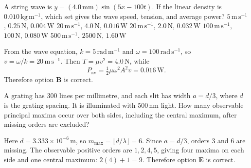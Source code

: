 \begin{quizquestion}[
  id=phy104-wave-031,
  topic=waves-and-sound,
  difficulty=applied,
  marks=2,
  correct=B,
  tags={travelling-wave,string,power},
  outcome={Relate a wave equation to speed tension and average power}
]
  A string wave is
  \(y=(4.0\,\mathrm{mm})\sin(5x-100t)\). If the linear density is
  \(0.010\,\mathrm{kg\,m^{-1}}\), which set gives the wave speed, tension,
  and average power?
  \choices
    {\(5\,\mathrm{m\,s^{-1}}\), \(0.25\,\mathrm{N}\), \(0.004\,\mathrm{W}\)}
    {\(20\,\mathrm{m\,s^{-1}}\), \(4.0\,\mathrm{N}\), \(0.016\,\mathrm{W}\)}
    {\(20\,\mathrm{m\,s^{-1}}\), \(2.0\,\mathrm{N}\), \(0.032\,\mathrm{W}\)}
    {\(100\,\mathrm{m\,s^{-1}}\), \(100\,\mathrm{N}\), \(0.080\,\mathrm{W}\)}
    {\(500\,\mathrm{m\,s^{-1}}\), \(2500\,\mathrm{N}\), \(1.60\,\mathrm{W}\)}
\end{quizquestion}
\begin{quizsolution}
  From the wave equation, \(k=5\,\mathrm{rad\,m^{-1}}\) and
  \(\omega=100\,\mathrm{rad\,s^{-1}}\), so
  \(v=\omega/k=20\,\mathrm{m\,s^{-1}}\). Then
  \(T=\mu v^2=4.0\,\mathrm{N}\), while
  \[
    P_{\mathrm{av}}=\tfrac12\mu\omega^2A^2v=0.016\,\mathrm{W}.
  \]
  Therefore option \textbf{B} is correct.
\end{quizsolution}

\begin{quizquestion}[
  id=phy104-opt-060,
  topic=optics,
  difficulty=challenge,
  marks=3,
  correct=E,
  tags={diffraction-grating,missing-orders},
  outcome={Combine grating-order limits with missing-order conditions}
]
  A grating has \(300\) lines per millimetre, and each slit has width
  \(a=d/3\), where \(d\) is the grating spacing. It is illuminated with
  \(500\,\mathrm{nm}\) light. How many observable principal maxima occur
  over both sides, including the central maximum, after missing orders are
  excluded?
\end{quizquestion}
\begin{quizsolution}
  Here \(d=3.333\times10^{-6}\,\mathrm{m}\), so
  \(m_{\max}=\lfloor d/\lambda\rfloor=6\). Since \(a=d/3\), orders
  \(3\) and \(6\) are missing. The observable positive orders are
  \(1,2,4,5\), giving four maxima on each side and one central maximum:
  \(2(4)+1=9\). Therefore option \textbf{E} is correct.
\end{quizsolution}
